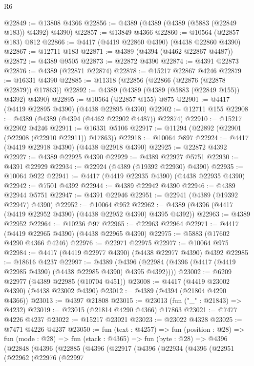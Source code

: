 \begin{lexlean}{R6}
\begin{coremodule}
@22849 := @13808 @4366
@22856 := @4389 (@4389 (@4389 (@5883 (@22849 @183)) @4392) @4390)
@22857 := @13849 @4366
@22860 := @10564 (@22857 @183) @812
@22866 := @4417 (@4419 @22860 @4390) (@4438 @22860 @4390)
@22867 := @12711 @183
@22871 := @4389 (@4394 (@4462 @22867 @4487))
@22872 := @4389 @9505
@22873 := @22872 @4390
@22874 := @4391 @22873
@22876 := @4389 (@22871 @22874)
@22878 := @15217 @22867 @4246
@22879 := @16331 @4390
@22885 := @11318 (@22856 (@22866 (@22876 (@22878 @22879)) @17863))
@22892 := @4389 (@4389 (@4389 (@5883 (@22849 @155)) @4392) @4390)
@22895 := @10564 (@22857 @155) @875
@22901 := @4417 (@4419 @22895 @4390) (@4438 @22895 @4390)
@22902 := @12711 @155
@22908 := @4389 (@4389 (@4394 (@4462 @22902 @4487)) @22874)
@22910 := @15217 @22902 @4246
@22911 := @16331 @5106
@22917 := @11294 (@22892 (@22901 (@22908 (@22910 @22911)) @17863))
@22918 := @10064 @897
@22924 := @4417 (@4419 @22918 @4390) (@4438 @22918 @4390)
@22925 := @22872 @4392
@22927 := @4389 @22925 @4390
@22929 := @4389 @22927 @5751
@22930 := @4391 @22929
@22934 := @22924 (@4389 (@19392 @22930) @4390)
@22935 := @10064 @922
@22941 := @4417 (@4419 @22935 @4390) (@4438 @22935 @4390)
@22942 := @7501 @4392
@22944 := @4389 @22942 @4390
@22946 := @4389 @22944 @5751
@22947 := @4391 @22946
@22951 := @22941 (@4389 (@19392 @22947) @4390)
@22952 := @10064 @952
@22962 := @4389 (@4396 (@4417 (@4419 @22952 @4390) (@4438 @22952 @4390) @4395 @4392))
@22963 := @4389 @22952
@22964 := @10236 @97
@22965 := @22963 @22964
@22971 := @4417 (@4419 @22965 @4390) (@4438 @22965 @4390)
@22975 := @5883 (@17602 @4290 @4366 @4246)
@22976 := @22971 @22975
@22977 := @10064 @975
@22984 := @4417 (@4419 @22977 @4390) (@4438 @22977 @4390) @4392
@22985 := @18616 @4237
@22997 := @4389
    (@4396 (@22984 (@4396 (@4417 (@4419 @22985 @4390) (@4438 @22985 @4390) @4395 @4392))))
@23002 := @6209 @22977 (@4389 @22985 (@10704 @451))
@23008 := @4417 (@4419 @23002 @4390) (@4438 @23002 @4390)
@23012 := @4389 (@4394 (@21804 @4290 @4366))
@23013 := @4397 @21808
@23015 := @23013 (fun ("_" : @21843) => @4232)
@23019 := @23015 (@21814 @4290 @4366) @17863
@23021 := @7477 @4226 @4237
@23022 := @15217 @23021
@23023 := @23022 @4328
@23025 := @7471 @4226 @4237
@23050 := fun (text : @4257) =>
  fun (position : @28) =>
  fun (mode : @28) =>
  fun (stack : @4365) =>
  fun (byte : @28) =>
  @4396
    (@22848
      (@4396
        (@22885
          (@4396
            (@22917
              (@4396
                (@22934
                  (@4396
                    (@22951
                      (@22962
                        (@22976
                          (@22997

\end{coremodule}
\end{lexlean}
